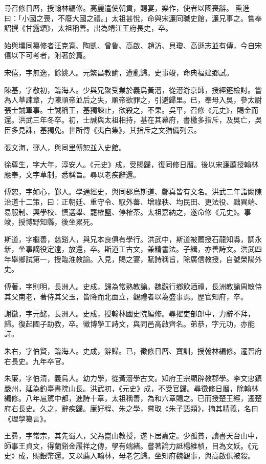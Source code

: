 \begin{pinyinscope}
尋召修日曆，授翰林編修。高麗遣使朝貢，賜宴，樂作，使者以國喪辭。熏進曰：「小國之喪，不廢大國之禮。」太祖甚悅，命與宋濂同職史館，濂兄事之。嘗奉詔撰《甘露頌》，太祖稱善。出為靖江王府長史，卒。

始與壎同纂修者汪克寬、陶凱、曾魯、高啟、趙汸、貝瓊、高遜志並有傳，今自宋僖以下可考者，附著於篇。

宋僖，字無逸，餘姚人。元繁昌教諭，遭亂歸。史事竣，命典福建鄉試。

陳基，字敬初，臨海人。少與兄聚受業於義烏黃溍，從溍游京師，授經筵檢討。嘗為人草諫章，力陳順帝並后之失，順帝欲罪之，引避歸里。已，奉母入吳，參太尉張士誠軍事。士誠稱王，基獨諫止，欲殺之，不果。吳平，召修《元史》，賜金而還。洪武三年冬卒。初，士誠與太祖相持，基在其幕府，書檄多指斥，及吳亡，吳臣多見誅，基獨免。世所傳《夷白集》，其指斥之文猶備列云。

張文海，鄞人，與同里傅恕並入史館。

徐尊生，字大年，淳安人。《元史》成，受賜歸，復同修日曆。後以宋濂薦授翰林應奉，文字草制，悉稱旨。尋以老疾辭還。

傅恕，字如心，鄞人。學通經史，與同郡烏斯道、鄭真皆有文名。洪武二年詣闕陳治道十二策，曰：正朝廷、重守令、馭外蕃、增祿秩、均民田、更法役、黜異端、易服制、興學校、慎選舉、罷榷鹽、停榷茶。太祖嘉納之，遂命修《元史》。事竣，授博野知縣，後坐累死。

斯道，字繼善，慈谿人，與兄本良俱有學行。洪武中，斯道被薦授石龍知縣，調永新，坐事謫役定遠，放還，卒。斯道工古文，兼精書法。子緝，亦善詩文。洪武四年舉鄉試第一，授臨淮教諭。入見，賜之宴，賦詩稱旨，除廣信教授，自號榮陽外史。

傅著，字則明，長洲人。史成，歸為常熟教諭。魏觀行鄉飲酒禮，長洲教諭周敏侍其父南老，著侍其父玉，皆降而北面立，觀禮者以為盛事焉。歷官知府，卒。

謝徽，字元懿，長洲人。史成，授翰林國史院編修。尋擢吏部郎中，力辭不拜，歸。復起國子助教，卒。徽博學工詩文，與同邑高啟齊名。弟恭，字元功，亦能詩。

朱右，字伯賢，臨海人。史成，辭歸。已，徵修日曆、寶訓，授翰林編修。遷晉府右長史。九年卒官。

朱廉，字伯清，義烏人。幼力學，從黃溍學古文。知府王宗顯辟教郡學。李文忠鎮嚴州，延為釣臺書院山長。洪武初，《元史》成，不受官歸。尋徵修日曆，除翰林編修。八年扈駕中都，進詩十章，太祖稱善，為和六章賜之。已而授楚王經，遷楚府右長史。久之，辭疾歸。廉好程、朱之學，嘗取《朱子語類》，摘其精義，名曰《理學纂言》。

王彞，字常宗，其先蜀人，父為崑山教授，遂卜居嘉定。少孤貧，讀書天台山中，師事王貞文，得蘭谿金履祥之傳，學有端緒。嘗著論力詆楊維楨，目為文妖。《元史》成，賜銀幣還。又以薦入翰林，母老乞歸。坐知府魏觀事，與高啟俱被殺。


\end{pinyinscope}

